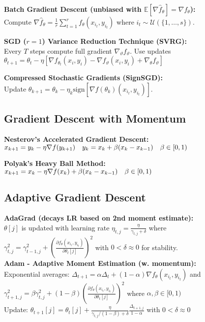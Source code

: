 \textbf{Batch Gradient Descent (unbiased with $\mathbb{E}[\nabla \hat{f}_\theta] = \nabla f_\theta$):}\\
Compute $\nabla \hat f_\theta = \frac{1}{r}\sum_{t=1}^r f_\theta(x_{i_t}, y_{i_t})$ where $i_t \sim \mathcal U(\{1, \ldots, s\})$.

\textbf{SGD ($r=1$) Variance Reduction Technique (SVRG):}\\
Every $T$ steps compute full gradient $\nabla_\vartheta f_{\vartheta}$. Use updates $\theta_{t+1}=\theta_t-\eta[\nabla f_{\theta_t}(x_i, y_i)-\nabla f_{\vartheta}(x_i, y_i) +\nabla_\theta f_{\vartheta}]$

\textbf{Compressed Stochastic Gradients (SignSGD):}\\
Update $\theta_{k+1} = \theta_k-\eta_k\text{sign}[\nabla f(\theta_k)(x_{i_t}, y_{i_t})]$.

\subsection*{Gradient Descent with Momentum}
\textbf{Nesterov’s Accelerated Gradient Descent:}\\
$x_{k+1} = y_{k}-\eta\nabla f(y_{k+1}) \quad y_{k} = x_k+\beta(x_k-x_{k-1}) \quad\hfill \beta \in [0,1)$

\textbf{Polyak's Heavy Ball Method:}\\
$x_{k+1} = x_k -\eta\nabla f(x_k)+\beta(x_k-x_{k-1})\quad\hfill \beta \in [0,1)$\\[-3pt]

\subsection*{Adaptive Gradient Descent}
\textbf{AdaGrad (decays LR based on 2nd moment estimate):}\\
$\theta[j]$ is updated with learning rate $\eta_{t,j} = \frac{\eta}{\gamma_{t,j} + \delta}$ where  $\gamma_{t,j}^2 = \gamma_{t-1,j}^2 + (\frac{\partial f_\theta(x_{i_t}, y_{i_t})}{\partial \theta_{t}[j]})^2$ with  $0 < \delta \approx 0$ for stability.\\
\textbf{Adam - Adaptive Moment Estimation (w. momentum):}\\
Exponential averages: $\Delta_{t+1} = \alpha \Delta_t + (1-\alpha)\nabla{f_\theta}(x_{i_t},y_{i_t})$ and $\gamma_{t+1,j}^2 = \beta\gamma_{t,j}^2 + (1-\beta)(\frac{\partial f_\theta(x_{i_t}, y_{i_t})}{\partial \theta_{t}[j]})^2$ where $\alpha, \beta \in [0,1)$\\
Update: $\theta_{t+1}[j] = \theta_{t}[j] + \frac{\eta}{\gamma_{t,j}/(1-\beta)+\delta}\frac{\Delta_{t+1,j}}{1-\alpha}$ with  $0 < \delta \approx 0$\\

